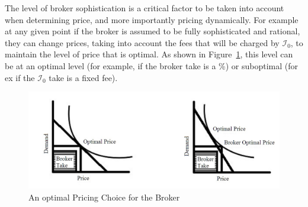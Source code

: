 \documentclass[letterpaper, 12pt]{article}
\begin{document}
 The level of broker sophistication is a critical factor to be taken into account when determining price, and more importantly pricing dynamically. For example at any given point if the broker is assumed to be fully sophisticated and rational, they can change prices, taking into account the fees that will be charged by $\mathcal{I}_0$, to maintain the level of price that is optimal. As shown in Figure~\ref{fig:demc}, this level can be at an optimal level (for example, if the broker take is a \%) or suboptimal (for ex if the $\mathcal{I}_0$ take is a fixed fee). 
\begin{figure}[h]
	\centering
	\includegraphics[scale=.3]{IMG_20151201_112640407.jpg}
	\caption{An optimal Pricing Choice for the Broker}
	\label{fig:demc}
\end{figure}
\end{document}
